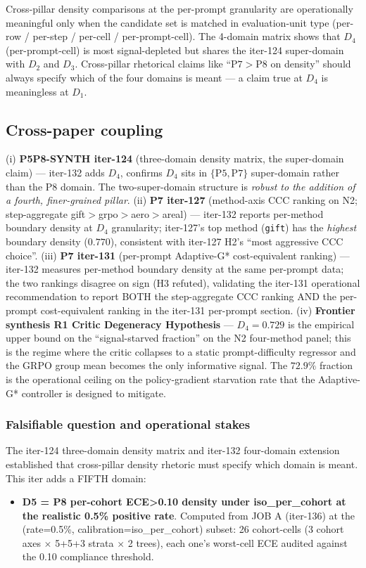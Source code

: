 \documentclass{article}
\begin{document}
Cross-pillar density comparisons at the per-prompt granularity are
operationally meaningful only when the candidate set is matched in
evaluation-unit type (per-row / per-step / per-cell / per-prompt-cell).
The 4-domain matrix shows that $D_4$ (per-prompt-cell) is most
signal-depleted but shares the iter-124 super-domain with $D_2$ and $D_3$.
Cross-pillar rhetorical claims like ``$\mathrm{P7} > \mathrm{P8}$ on
density'' should always specify which of the four domains is meant —
a claim true at $D_4$ is meaningless at $D_1$.

\subsection{Cross-paper coupling}

(i) \textbf{P5P8-SYNTH iter-124} (three-domain density matrix, the
super-domain claim) — iter-132 adds $D_4$, confirms $D_4$ sits in
$\{\mathrm{P5},\mathrm{P7}\}$ super-domain rather than the $\mathrm{P8}$
domain. The two-super-domain structure is \emph{robust to the
addition of a fourth, finer-grained pillar}.
(ii) \textbf{P7 iter-127} (method-axis CCC ranking on N2; step-aggregate
gift$>\!$grpo$>\!$aero$>\!$areal) — iter-132 reports per-method
boundary density at $D_4$ granularity; iter-127's top method
(\texttt{gift}) has the \emph{highest} boundary density ($0.770$),
consistent with iter-127 H2's ``most aggressive CCC choice''.
(iii) \textbf{P7 iter-131} (per-prompt Adaptive-G* cost-equivalent
ranking) — iter-132 measures per-method boundary density at the same
per-prompt data; the two rankings disagree on sign (H3 refuted),
validating the iter-131 operational recommendation to report BOTH the
step-aggregate CCC ranking AND the per-prompt cost-equivalent ranking
in the iter-131 per-prompt section.
(iv) \textbf{Frontier synthesis R1 Critic Degeneracy Hypothesis} —
$D_4 = 0.729$ is the empirical upper bound on the ``signal-starved
fraction'' on the N2 four-method panel; this is the regime where the
critic collapses to a static prompt-difficulty regressor and the GRPO
group mean becomes the only informative signal. The $72.9\%$ fraction
is the operational ceiling on the policy-gradient starvation rate that
the Adaptive-G* controller is designed to mitigate.
 

\subsubsection{Falsifiable question and operational stakes}

The iter-124 three-domain density matrix and iter-132 four-domain
extension established that cross-pillar density rhetoric must specify
which domain is meant. This iter adds a FIFTH domain:
\begin{itemize}
\item \textbf{D5 = P8 per-cohort ECE>0.10 density under iso\_per\_cohort at the realistic 0.5\% positive rate}.
      Computed from JOB A (iter-136) at the (rate=0.5\%, calibration=iso\_per\_cohort) subset:
      26 cohort-cells (3 cohort axes $\times$ 5+5+3 strata $\times$ 2 trees), each one's
      worst-cell ECE audited against the 0.10 compliance threshold.
\end{itemize}
\end{document}
